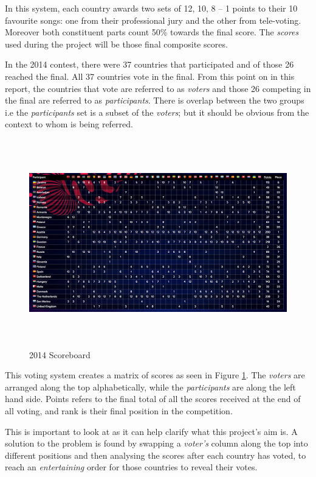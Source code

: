 \documentclass[12pt]{report}
\begin{document}
In this system, each country awards two sets of 12, 10, 8 – 1 points to their 10 favourite songs: one from their professional jury and the other from tele-voting. Moreover both constituent parts count 50\% towards the final score. The \textit{scores} used during the project will be those final composite scores.

In the 2014 contest, there were 37 countries that participated and of those 26 reached the final. All 37 countries vote in the final. From this point on in this report, the countries that vote are referred to as \textit{voters} and those 26 competing in the final are referred to as \textit{participants}. There is overlap between the two groups i.e the \textit{participants} set is a subset of the \textit{voters}; but it should be obvious from the context to whom is being referred.

\begin{figure}[H]
\centering
\includegraphics[width=16cm, height=9cm]{./2014Scoreboard}
\caption{2014 Scoreboard}
\label{f_2014Scores}
\end{figure}

This voting system creates a matrix of scores as seen in Figure \ref{f_2014Scores}\cite{EurovisionScoreboard}. The \textit{voters} are arranged along the top alphabetically, while the \textit{participants} are along the left hand side. Points refers to the final total of all the scores received at the end of all voting, and rank is their final position in the competition. 

This is important to look at as it can help clarify what this project's aim is. A solution to the problem is found by swapping a \textit{voter's} column along the top into different positions and then analysing the scores after each country has voted, to reach an \textit{entertaining} order for those countries to reveal their votes.
\end{document}
